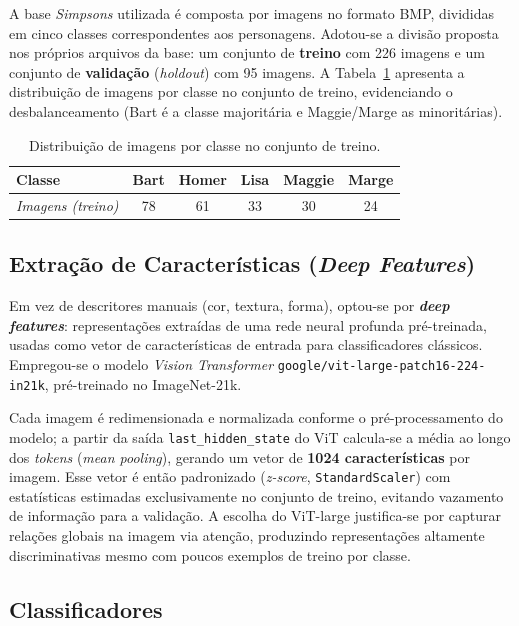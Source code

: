 \documentclass[12pt]{article}
\begin{document}
A base \textit{Simpsons} utilizada é composta por imagens no formato BMP,
divididas em cinco classes correspondentes aos personagens. Adotou-se a divisão
proposta nos próprios arquivos da base: um conjunto de \textbf{treino} com 226
imagens e um conjunto de \textbf{validação} (\textit{holdout}) com 95 imagens.
A Tabela~\ref{tab:base} apresenta a distribuição de imagens por classe no
conjunto de treino, evidenciando o desbalanceamento (Bart é a classe majoritária
e Maggie/Marge as minoritárias).

\begin{table}[H]
\centering
\caption{Distribuição de imagens por classe no conjunto de treino.}
\label{tab:base}
\begin{tabular}{lccccc}
\toprule
Classe & Bart & Homer & Lisa & Maggie & Marge \\
\midrule
\textit{Imagens (treino)} & 78 & 61 & 33 & 30 & 24 \\
\bottomrule
\end{tabular}
\end{table}

\subsection{Extração de Características (\textit{Deep Features})}

Em vez de descritores manuais (cor, textura, forma), optou-se por
\textbf{\textit{deep features}}: representações extraídas de uma rede neural
profunda pré-treinada, usadas como vetor de características de entrada para
classificadores clássicos. Empregou-se o modelo \textit{Vision Transformer}
\texttt{google/vit-large-patch16-224-in21k}, pré-treinado no ImageNet-21k.

Cada imagem é redimensionada e normalizada conforme o pré-processamento do
modelo; a partir da saída \texttt{last\_hidden\_state} do ViT calcula-se a média
ao longo dos \textit{tokens} (\textit{mean pooling}), gerando um vetor de
\textbf{1024 características} por imagem. Esse vetor é então padronizado
(\textit{z-score}, \texttt{StandardScaler}) com estatísticas estimadas
exclusivamente no conjunto de treino, evitando vazamento de informação para a
validação. A escolha do ViT-large justifica-se por capturar relações globais na
imagem via atenção, produzindo representações altamente discriminativas mesmo com
poucos exemplos de treino por classe.

\subsection{Classificadores}
\end{document}
